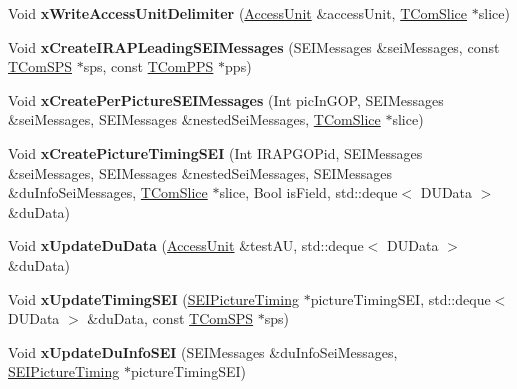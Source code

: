 \begin{DoxyCompactItemize}
Void {\bfseries x\+Write\+Access\+Unit\+Delimiter} (\hyperlink{class_access_unit}{Access\+Unit} \&access\+Unit, \hyperlink{class_t_com_slice}{T\+Com\+Slice} $\ast$slice)
\item 
\mbox{\label{class_t_enc_g_o_p_a2c7b159ed8a8ce27f8f5aeb023c1f22c}} 
Void {\bfseries x\+Create\+I\+R\+A\+P\+Leading\+S\+E\+I\+Messages} (S\+E\+I\+Messages \&sei\+Messages, const \hyperlink{class_t_com_s_p_s}{T\+Com\+S\+PS} $\ast$sps, const \hyperlink{class_t_com_p_p_s}{T\+Com\+P\+PS} $\ast$pps)
\item 
\mbox{\label{class_t_enc_g_o_p_aae4a913317da5344f9c025fb24403ab7}} 
Void {\bfseries x\+Create\+Per\+Picture\+S\+E\+I\+Messages} (Int pic\+In\+G\+OP, S\+E\+I\+Messages \&sei\+Messages, S\+E\+I\+Messages \&nested\+Sei\+Messages, \hyperlink{class_t_com_slice}{T\+Com\+Slice} $\ast$slice)
\item 
\mbox{\label{class_t_enc_g_o_p_aca1d7aaacf572ae3b8da140896ce0104}} 
Void {\bfseries x\+Create\+Picture\+Timing\+S\+EI} (Int I\+R\+A\+P\+G\+O\+Pid, S\+E\+I\+Messages \&sei\+Messages, S\+E\+I\+Messages \&nested\+Sei\+Messages, S\+E\+I\+Messages \&du\+Info\+Sei\+Messages, \hyperlink{class_t_com_slice}{T\+Com\+Slice} $\ast$slice, Bool is\+Field, std\+::deque$<$ D\+U\+Data $>$ \&du\+Data)
\item 
\mbox{\label{class_t_enc_g_o_p_a7d4d840f0958217934157025a998ce4b}} 
Void {\bfseries x\+Update\+Du\+Data} (\hyperlink{class_access_unit}{Access\+Unit} \&test\+AU, std\+::deque$<$ D\+U\+Data $>$ \&du\+Data)
\item 
\mbox{\label{class_t_enc_g_o_p_a4109e4355bf083c07f1c563b4968ebfb}} 
Void {\bfseries x\+Update\+Timing\+S\+EI} (\hyperlink{class_s_e_i_picture_timing}{S\+E\+I\+Picture\+Timing} $\ast$picture\+Timing\+S\+EI, std\+::deque$<$ D\+U\+Data $>$ \&du\+Data, const \hyperlink{class_t_com_s_p_s}{T\+Com\+S\+PS} $\ast$sps)
\item 
\mbox{\label{class_t_enc_g_o_p_afe610354742ab41c0b3b86e7e03c3df5}} 
Void {\bfseries x\+Update\+Du\+Info\+S\+EI} (S\+E\+I\+Messages \&du\+Info\+Sei\+Messages, \hyperlink{class_s_e_i_picture_timing}{S\+E\+I\+Picture\+Timing} $\ast$picture\+Timing\+S\+EI)
\item 

\end{DoxyCompactItemize}
